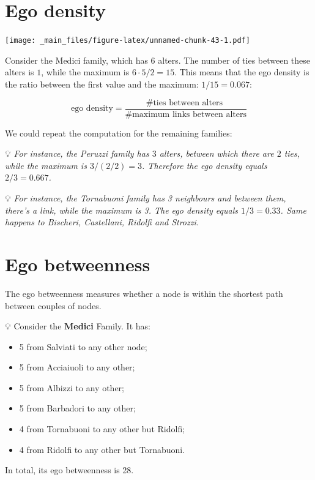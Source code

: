 \documentclass[
  notitlepage,
  onecolumn,
  openany]{book}
\providecommand{\tightlist}{%
  \setlength{\itemsep}{0pt}\setlength{\parskip}{0pt}}
\begin{document}
\hypertarget{ego-density}{%
\section{Ego density}\label{ego-density}}

\texttt{[image: \_main\_files/figure-latex/unnamed-chunk-43-1.pdf]}

Consider the Medici family, which has \(6\) alters. The number of ties between these alters is \(1\), while the maximum is \(6\cdot 5/2 = 15\). This means that the ego density is the ratio between the first value and the maximum: \(1/15 = 0.067\):

\[
\text{ego density} = \frac{ \text{\# ties between alters }}{\text{\# maximum links between alters}}
\]

We could repeat the computation for the remaining families:

💡 \emph{For instance, the Peruzzi family has \(3\) alters, between which there are \(2\) ties, while the maximum is \(3/(2/2) = 3\). Therefore the ego density equals \(2/3 = 0.667\).}

💡 \emph{For instance, the Tornabuoni family has 3 neighbours and between them, there's a link, while the maximum is 3. The ego density equals \(1/3 = 0.33\). Same happens to Bischeri, Castellani, Ridolfi and Strozzi.}

\hypertarget{ego-betweenness}{%
\section{Ego betweenness}\label{ego-betweenness}}

The ego betweenness measures whether a node is within the shortest path between couples of nodes.

💡 Consider the \textbf{Medici} Family. It has:

\begin{itemize}
\tightlist
\item
  5 from Salviati to any other node;
\item
  5 from Acciaiuoli to any other;
\item
  5 from Albizzi to any other;
\item
  5 from Barbadori to any other;
\item
  4 from Tornabuoni to any other but Ridolfi;
\item
  4 from Ridolfi to any other but Tornabuoni.
\end{itemize}

In total, its ego betweenness is 28.
\end{document}
